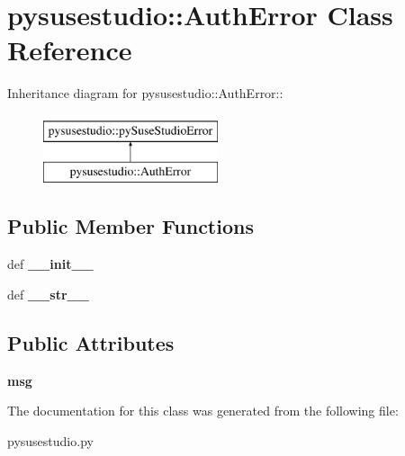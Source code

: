 \hypertarget{classpysusestudio_1_1_auth_error}{
\section{pysusestudio::AuthError Class Reference}
\label{classpysusestudio_1_1_auth_error}
}
Inheritance diagram for pysusestudio::AuthError::\begin{figure}[H]
\begin{center}
\leavevmode
\includegraphics[height=2cm]{classpysusestudio_1_1_auth_error}
\end{center}
\end{figure}
\subsection*{Public Member Functions}
\begin{DoxyCompactItemize}
\item 
\hypertarget{classpysusestudio_1_1_auth_error_a71690316a4d97777e77e484d31183509}{
def {\bfseries \_\-\_\-init\_\-\_\-}}
\label{classpysusestudio_1_1_auth_error_a71690316a4d97777e77e484d31183509}

\item 
\hypertarget{classpysusestudio_1_1_auth_error_ae3d558da4555fc4285185b9f1afcad18}{
def {\bfseries \_\-\_\-str\_\-\_\-}}
\label{classpysusestudio_1_1_auth_error_ae3d558da4555fc4285185b9f1afcad18}

\end{DoxyCompactItemize}
\subsection*{Public Attributes}
\begin{DoxyCompactItemize}
\item 
\hypertarget{classpysusestudio_1_1_auth_error_a32ce5c08c2034b562f1d99aaa1166cf2}{
{\bfseries msg}}
\label{classpysusestudio_1_1_auth_error_a32ce5c08c2034b562f1d99aaa1166cf2}

\end{DoxyCompactItemize}


The documentation for this class was generated from the following file:\begin{DoxyCompactItemize}
\item 
pysusestudio.py\end{DoxyCompactItemize}
